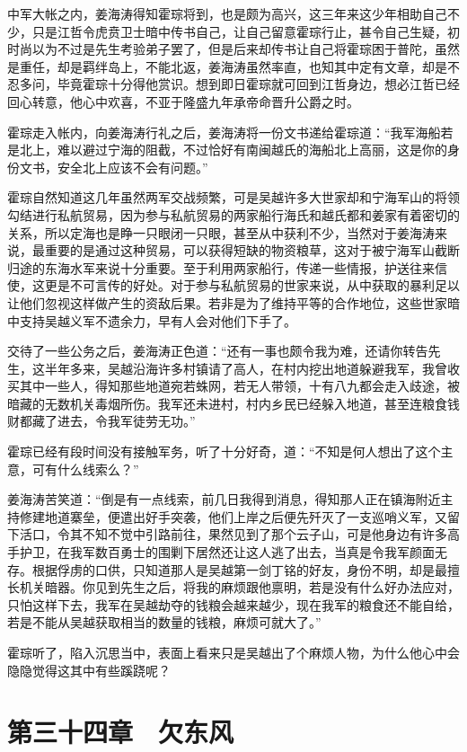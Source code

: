中军大帐之内，姜海涛得知霍琮将到，也是颇为高兴，这三年来这少年相助自己不少，只是江哲令虎贲卫士暗中传书自己，让自己留意霍琮行止，甚令自己生疑，初时尚以为不过是先生考验弟子罢了，但是后来却传书让自己将霍琮困于普陀，虽然是重任，却是羁绊岛上，不能北返，姜海涛虽然率直，也知其中定有文章，却是不忍多问，毕竟霍琮十分得他赏识。想到即日霍琮就可回到江哲身边，想必江哲已经回心转意，他心中欢喜，不亚于隆盛九年承帝命晋升公爵之时。

霍琮走入帐内，向姜海涛行礼之后，姜海涛将一份文书递给霍琮道：“我军海船若是北上，难以避过宁海的阻截，不过恰好有南闽越氏的海船北上高丽，这是你的身份文书，安全北上应该不会有问题。”

霍琮自然知道这几年虽然两军交战频繁，可是吴越许多大世家却和宁海军山的将领勾结进行私航贸易，因为参与私航贸易的两家船行海氏和越氏都和姜家有着密切的关系，所以定海也是睁一只眼闭一只眼，甚至从中获利不少，当然对于姜海涛来说，最重要的是通过这种贸易，可以获得短缺的物资粮草，这对于被宁海军山截断归途的东海水军来说十分重要。至于利用两家船行，传递一些情报，护送往来信使，这更是不可言传的好处。对于参与私航贸易的世家来说，从中获取的暴利足以让他们忽视这样做产生的资敌后果。若非是为了维持平等的合作地位，这些世家暗中支持吴越义军不遗余力，早有人会对他们下手了。

交待了一些公务之后，姜海涛正色道：“还有一事也颇令我为难，还请你转告先生，这半年多来，吴越沿海许多村镇请了高人，在村内挖出地道躲避我军，我曾收买其中一些人，得知那些地道宛若蛛网，若无人带领，十有八九都会走入歧途，被暗藏的无数机关毒烟所伤。我军还未进村，村内乡民已经躲入地道，甚至连粮食钱财都藏了进去，令我军徒劳无功。”

霍琮已经有段时间没有接触军务，听了十分好奇，道：“不知是何人想出了这个主意，可有什么线索么？”

姜海涛苦笑道：“倒是有一点线索，前几日我得到消息，得知那人正在镇海附近主持修建地道寨垒，便遣出好手突袭，他们上岸之后便先歼灭了一支巡哨义军，又留下活口，令其不知不觉中引路前往，果然见到了那个云子山，可是他身边有许多高手护卫，在我军数百勇士的围剿下居然还让这人逃了出去，当真是令我军颜面无存。根据俘虏的口供，只知道那人是吴越第一剑丁铭的好友，身份不明，却是最擅长机关暗器。你见到先生之后，将我的麻烦跟他禀明，若是没有什么好办法应对，只怕这样下去，我军在吴越劫夺的钱粮会越来越少，现在我军的粮食还不能自给，若是不能从吴越获取相当的数量的钱粮，麻烦可就大了。”

霍琮听了，陷入沉思当中，表面上看来只是吴越出了个麻烦人物，为什么他心中会隐隐觉得这其中有些蹊跷呢？

\chapter{第三十四章　欠东风}


